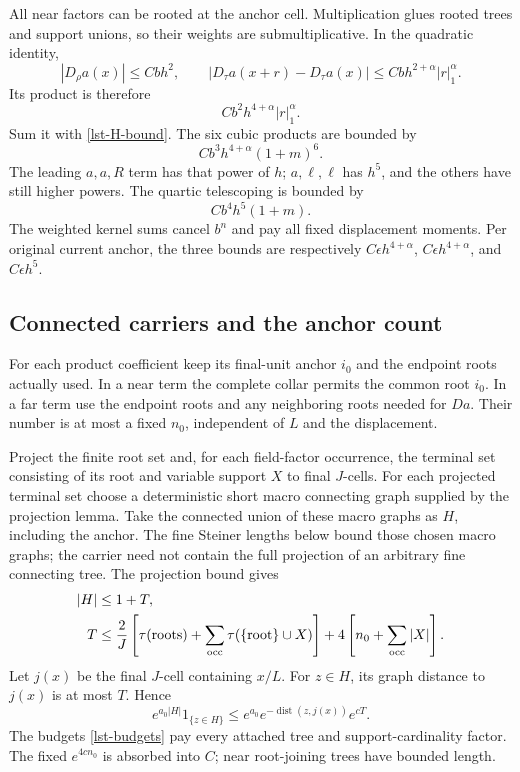 \documentclass[11pt]{article}
\theoremstyle{remark}
\begin{document}
All near factors can be rooted at the anchor cell.
Multiplication glues rooted trees and support unions, so
their weights are submultiplicative. In the quadratic
identity,
\[
 |D_\rho a(x)|\le Cbh^2,\qquad
 |D_\tau a(x+r)-D_\tau a(x)|
                      \le Cbh^{2+\alpha}|r|_1^\alpha.
\]
Its product is therefore
\begin{equation}
 Cb^2h^{4+\alpha}|r|_1^\alpha.
 \label{lst-near-quadratic}
\end{equation}
Sum it with \eqref{lst-H-bound}. The six cubic products
are bounded by
\begin{equation}
 Cb^3h^{4+\alpha}(1+m)^6.
 \label{lst-near-cubic}
\end{equation}
The leading \(a,a,R\) term has that power of \(h\);
\(a,\ell,\ell\) has \(h^5\), and the others have still
higher powers. The quartic telescoping is bounded by
\begin{equation}
 Cb^4h^5(1+m).
 \label{lst-near-quartic}
\end{equation}
The weighted kernel sums cancel \(b^n\) and pay all
fixed displacement moments. Per original current anchor,
the three bounds are respectively
\(C\epsilon h^{4+\alpha}\),
\(C\epsilon h^{4+\alpha}\), and \(C\epsilon h^5\).

\subsection{Connected carriers and the anchor count}
\label{lst-carriers-section}

For each product coefficient keep its final-unit anchor
\(i_0\) and the endpoint roots actually used. In a near
term the complete collar permits the common root \(i_0\).
In a far term use the endpoint roots and any neighboring
roots needed for \(Da\). Their number is at most a fixed
\(n_0\), independent of \(L\) and the displacement.

Project the finite root set and, for each field-factor
occurrence, the terminal set consisting of its root
and variable support \(X\) to final \(J\)-cells.
For each projected terminal set choose a deterministic
short macro connecting graph supplied by the projection
lemma. Take the connected union of these macro graphs
as \(H\), including the anchor. The fine Steiner
lengths below bound those chosen macro graphs; the
carrier need not contain the full projection of an
arbitrary fine connecting tree. The projection bound gives
\begin{align}
 |H|&\le1+T,\notag\\
 T&\le\frac2J\left[
       \tau(\text{roots})+
       \sum_{\mathrm{occ}}\tau(\{\text{root}\}\cup X)\right]
         +4\left[n_0+\sum_{\mathrm{occ}}|X|\right].
 \label{lst-tree-bound}
\end{align}
Let \(j(x)\) be the final \(J\)-cell containing \(x/L\).
For \(z\in H\), its graph distance to \(j(x)\) is at
most \(T\). Hence
\begin{equation}
 e^{a_0|H|}1_{\{z\in H\}}
 \le e^{a_0}e^{-\operatorname{dist}(z,j(x))}e^{cT}.
 \label{lst-reroot}
\end{equation}
The budgets \eqref{lst-budgets} pay every attached
tree and support-cardinality factor. The fixed
\(e^{4cn_0}\) is absorbed into \(C\); near root-joining
trees have bounded length.
\end{document}
